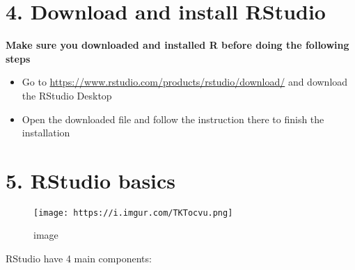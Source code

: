 \documentclass[
]{book}
\begin{document}
\hypertarget{download-and-install-rstudio}{%
\section{4. Download and install RStudio}\label{download-and-install-rstudio}}

\textbf{Make sure you downloaded and installed R before doing the following steps}

\begin{itemize}
\item
  Go to \url{https://www.rstudio.com/products/rstudio/download/} and download the RStudio Desktop
\item
  Open the downloaded file and follow the instruction there to finish the installation
\end{itemize}

\hypertarget{rstudio-basics}{%
\section{5. RStudio basics}\label{rstudio-basics}}

\begin{figure}
\centering
\texttt{[image: https://i.imgur.com/TKTocvu.png]}
\caption{image}
\end{figure}

RStudio have 4 main components:
\end{document}
